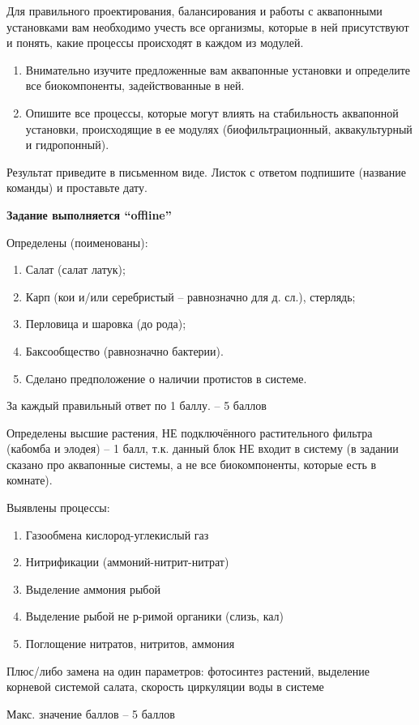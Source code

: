 
Для правильного проектирования, балансирования и работы с аквапонными установками вам необходимо учесть все организмы, которые в ней присутствуют и понять, какие процессы происходят в каждом из модулей. 
 
\begin{enumerate}
    \item Внимательно изучите предложенные вам аквапонные установки и определите все биокомпоненты, задействованные в ней.
    \item Опишите все процессы, которые могут влиять на стабильность аквапонной установки, происходящие в ее модулях (биофильтрационный, аквакультурный и гидропонный).
\end{enumerate}
  
Результат приведите в письменном виде. Листок с ответом подпишите (название команды) и проставьте дату.

\textbf{Задание выполняется “offline”}

\markSection

Определены (поименованы):

\begin{enumerate}
    \item Салат (салат латук);
    \item Карп (кои и/или серебристый – равнозначно для д. сл.), стерлядь;
    \item Перловица и шаровка (до рода);
    \item Баксообщество (равнозначно бактерии).
    \item Сделано предположение о наличии протистов в системе.
\end{enumerate}

За каждый правильный ответ по 1 баллу.  – 5 баллов

Определены высшие растения, НЕ подключённого растительного фильтра (кабомба и элодея) – 1 балл, т.к. данный блок НЕ входит в систему (в задании сказано про аквапонные системы, а не все биокомпоненты, которые есть в комнате).

Выявлены процессы:

\begin{enumerate}
    \item Газообмена кислород-углекислый газ
    \item Нитрификации (аммоний-нитрит-нитрат)
    \item Выделение аммония рыбой
    \item Выделение рыбой не р-римой органики (слизь, кал)
    \item Поглощение нитратов, нитритов, аммония
\end{enumerate}

Плюс/либо замена на один параметров: фотосинтез растений, выделение корневой системой салата, скорость циркуляции воды в системе

Макс. значение баллов – 5 баллов